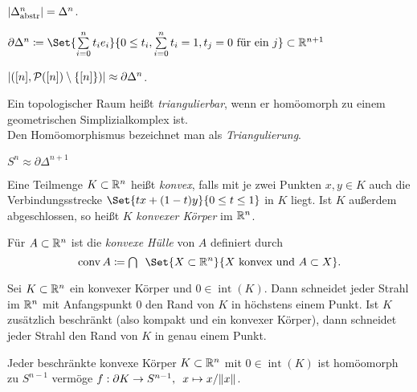 \documentclass{cheat-sheet}
\DeclareMathOperator{\inte}{int} %
\DeclareMathOperator{\conv}{conv} %
\begin{document}
\begin{prop}
  $\lvert\Delta^n_{\text{abstr}}\rvert = \Delta^n$.
\end{prop}


\begin{defn}
  $\partial \Delta^n \coloneqq \Set{ \sum_{i=0}^n t_i e_i }{ 0 \leq t_i, \sum_{i=0}^n t_i = 1, t_j = 0 \text{ für ein } j } \subset \R^{n+1}$
\end{defn}

\begin{prop}
  $\lvert([n], \mathcal{P}([n]) \setminus \{ [n] \})\rvert \approx \partial \Delta^n$.
\end{prop}

\begin{defn}
  Ein topologischer Raum heißt \emph{triangulierbar}, wenn er homöomorph zu einem geometrischen Simplizialkomplex ist.\\
  Den Homöomorphismus bezeichnet man als \emph{Triangulierung}.
\end{defn}

\begin{bsp}
  $S^n \approx \partial \Delta^{n+1}$
\end{bsp}

\begin{defn}
  Eine Teilmenge $K \subset \mathbb{R}^n$ heißt \emph{konvex}, falls mit je zwei Punkten $x, y \in K$ auch die Verbindungsstrecke $\Set{tx + (1-t)y}{ 0 \leq t \leq 1 }$ in $K$ liegt. Ist $K$ außerdem abgeschlossen, so heißt $K$ \emph{konvexer Körper} im $\mathbb{R}^n$.
\end{defn}

\begin{defn}
  Für $A \subset \mathbb{R}^n$ ist die \emph{konvexe Hülle} von $A$ definiert durch
  \[ \conv A \coloneqq \bigcap \enspace \Set{X \subset \R^n}{X \text{ konvex und } A \subset X}. \]
\end{defn}

\begin{prop}
  Sei $K \subset \mathbb{R}^n$ ein konvexer Körper und $0 \in \inte(K)$. Dann schneidet jeder Strahl im $\mathbb{R}^n$ mit Anfangspunkt $0$ den Rand von $K$ in höchstens einem Punkt. Ist $K$ zusätzlich beschränkt (also kompakt und ein konvexer Körper), dann schneidet jeder Strahl den Rand von $K$ in genau einem Punkt.
\end{prop}

\begin{prop}
  Jeder beschränkte konvexe Körper $K \subset \mathbb{R}^n$ mit $0 \in \inte(K)$ ist homöomorph zu $S^{n-1}$ vermöge
  $f : \partial K \to S^{n-1}, \enspace x \mapsto x / \lVert x\rVert$.
\end{prop}
\end{document}
